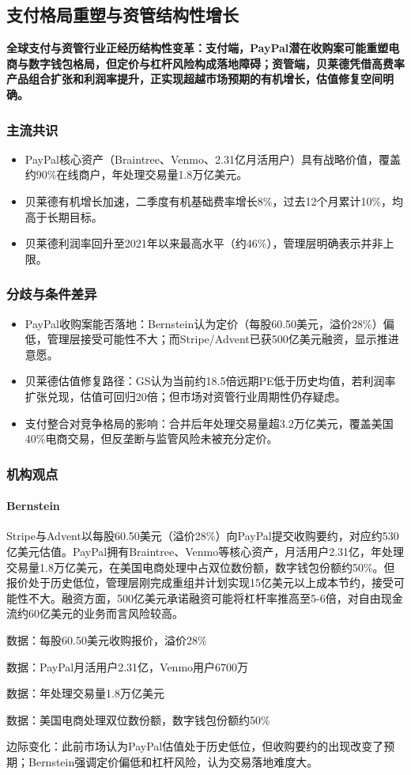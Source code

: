 \documentclass[11pt]{ctexart}
\begin{document}
\subsection{支付格局重塑与资管结构性增长}
\textbf{全球支付与资管行业正经历结构性变革：支付端，PayPal潜在收购案可能重塑电商与数字钱包格局，但定价与杠杆风险构成落地障碍；资管端，贝莱德凭借高费率产品组合扩张和利润率提升，正实现超越市场预期的有机增长，估值修复空间明确。}
\subsubsection*{主流共识}
\begin{itemize}
  \item PayPal核心资产（Braintree、Venmo、2.31亿月活用户）具有战略价值，覆盖约90\%在线商户，年处理交易量1.8万亿美元。
  \item 贝莱德有机增长加速，二季度有机基础费率增长8\%，过去12个月累计10\%，均高于长期目标。
  \item 贝莱德利润率回升至2021年以来最高水平（约46\%），管理层明确表示并非上限。
\end{itemize}
\subsubsection*{分歧与条件差异}
\begin{itemize}
  \item PayPal收购案能否落地：Bernstein认为定价（每股60.50美元，溢价28\%）偏低，管理层接受可能性不大；而Stripe/Advent已获500亿美元融资，显示推进意愿。
  \item 贝莱德估值修复路径：GS认为当前约18.5倍远期PE低于历史均值，若利润率扩张兑现，估值可回归20倍；但市场对资管行业周期性仍存疑虑。
  \item 支付整合对竞争格局的影响：合并后年处理交易量超3.2万亿美元，覆盖美国40\%电商交易，但反垄断与监管风险未被充分定价。
\end{itemize}
\subsubsection*{机构观点}
\paragraph{Bernstein} Stripe与Advent以每股60.50美元（溢价28\%）向PayPal提交收购要约，对应约530亿美元估值。PayPal拥有Braintree、Venmo等核心资产，月活用户2.31亿，年处理交易量1.8万亿美元，在美国电商处理中占双位数份额，数字钱包份额约50\%。但报价处于历史低位，管理层刚完成重组并计划实现15亿美元以上成本节约，接受可能性不大。融资方面，500亿美元承诺融资可能将杠杆率推高至5-6倍，对自由现金流约60亿美元的业务而言风险较高。
{\small\color{refgray}数据：每股60.50美元收购报价，溢价28\%\par}
{\small\color{refgray}数据：PayPal月活用户2.31亿，Venmo用户6700万\par}
{\small\color{refgray}数据：年处理交易量1.8万亿美元\par}
{\small\color{refgray}数据：美国电商处理双位数份额，数字钱包份额约50\%\par}
{\small\color{refgray}边际变化：此前市场认为PayPal估值处于历史低位，但收购要约的出现改变了预期；Bernstein强调定价偏低和杠杆风险，认为交易落地难度大。\par}
\end{document}
